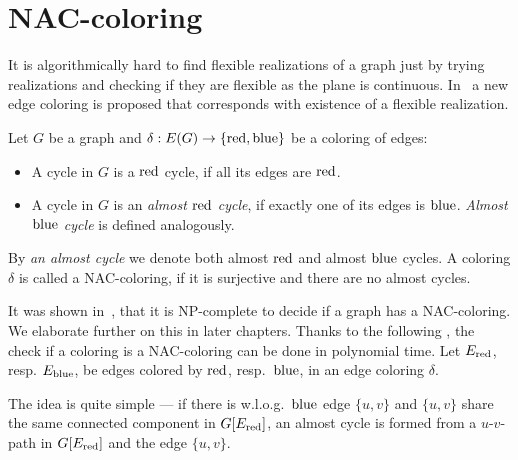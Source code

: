\section{NAC-coloring}

It is algorithmically hard to find flexible realizations of a graph
just by trying realizations and checking if they are flexible
as the plane is continuous.
In~\cite{legersky_original} a new edge coloring is proposed
that corresponds with existence of a flexible realization.

\begin{definition}
	Let \( G \) be a graph and \( \delta: E(G) \to \{ \text{red}, \text{blue} \} \)
	be a coloring of edges:
	\begin{itemize}
		\item A cycle in \( G \) is a \( \text{red} \) cycle, if all its edges are \( \text{red} \).
		\item A cycle in \( G \) is an \emph{almost \( \text{red} \) cycle},
		      if exactly one of its edges is \( \text{blue} \).
		      \emph{Almost \( \text{blue} \) cycle} is defined analogously.
	\end{itemize}
	By \emph{an almost cycle} we denote both almost \( \text{red} \) and almost \( \text{blue} \) cycles.
	A coloring \( \delta \) is called a NAC-coloring, if it is surjective
	and there are no almost cycles.
\end{definition}
%

It was shown in~\cite{np_complete}, that it is NP-complete to decide if a graph has a NAC-coloring.
We elaborate further on this in later chapters.
Thanks to the following ,
the check if a coloring is a NAC-coloring can be done in polynomial time.
Let \( E_{\text{red}}\), resp. \( E_{\text{blue}} \), be edges colored by \( \text{red} \), resp.~\( \text{blue} \),
in an edge coloring \( \delta \).
%
%
The idea is quite simple --- if there is w.l.o.g.\ \( \text{blue} \) edge \( \{u, v\} \)
and \( \{u, v\} \) share the same connected component in \( G[E_{\text{red}}] \),
an almost cycle is formed from a \( u \)-\( v \)-path in \( G[E_{\text{red}}] \)
and the edge \( \{u, v\} \).

